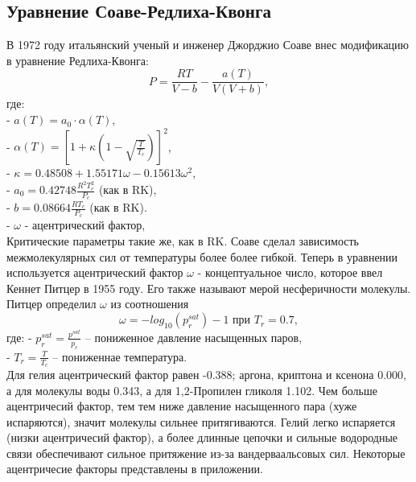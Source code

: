 \documentclass[a4paper]{article}
\numberwithin{equation}{subsection} %
\renewcommand{\thefootnote}{\fnsymbol{footnote}}
\begin{document}
\subsection{Уравнение Соаве-Редлиха-Квонга}
\renewcommand{\thefootnote}{*} 
В 1972 году итальянский ученый и инженер Джорджио Соаве внес модификацию в уравнение Редлиха-Квонга:
\begin{equation}
      P = \frac{RT}{V-b} - \frac{a(T)}{V(V+b)},
\tag{\thesubsection}
\end{equation}
где:\\
- $a(T) = a_0 \cdot \alpha(T)$,\\
- $\alpha(T) = \left[ 1 + \kappa(1-\sqrt{\frac{T}{T_c}})\right]^2$,\\
- $\kappa = 0.48508 + 1.55171\omega - 0.15613\omega^2$,\\
- $a_0 = 0.42748\frac{R^2T_c^{2}}{P_c}$ (как в RK),\\
- $b = 0.08664\frac{RT_c}{P_c}$ (как в RK).\\
- $\omega$ - ацентрический фактор\footnotemark{},\\
Критические параметры такие же, как в RK.
Соаве сделал зависимость межмолекулярных сил от температуры более более гибкой. Теперь в уравнении используется ацентрический фактор $\omega$ - концептуальное число, которое ввел Кеннет Питцер в 1955 году. Его также называют мерой несферичности молекулы. Питцер определил $\omega$ из соотношения
\begin{equation}
     \omega = -log_{10}(p^{sat}_r) - 1 \text{ при } T_r = 0.7,
\end{equation}
где:
- $p^{sat}_r = \frac{p^{sat}}{p_c}$ -- пониженное давление насыщенных паров,\\
- $T_r = \frac{T}{T_c}$ -- пониженнае температура. \\
Для гелия ацентрический фактор равен -0.388; аргона, криптона и ксенона 0.000, а для молекулы воды 0.343, а для 1,2-Пропилен гликоля 1.102. Чем больше ацентричесий фактор, тем тем ниже давление насыщенного пара (хуже испаряются), значит молекулы сильнее притягиваются. Гелий легко испаряется (низки ацентричесий фактор), а более длинные цепочки и сильные водородные связи обеспечивают сильное притяжение из-за вандерваальсовых сил. Некоторые ацентричесие факторы представлены в приложении.\\
\end{document}

